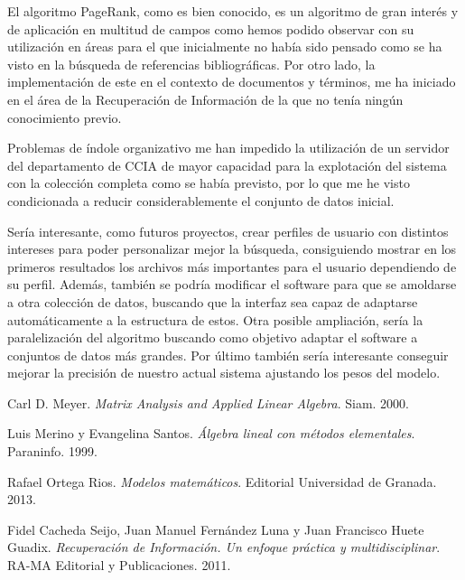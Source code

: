 \documentclass[size=a4, parskip=half, titlepage=false, toc=flat, toc=bib, 12pt, twoside]{scrartcl}
\theoremstyle{theorem-style}
\theoremstyle{definition-style}
\theoremstyle{remark-style}
\theoremstyle{example-style}
\theoremstyle{definition-style}
\theoremstyle{remark-style}
\begin{document}
El algoritmo PageRank, como es bien conocido, es un algoritmo de gran interés y de aplicación en multitud de campos como hemos podido observar con su utilización en áreas para el que inicialmente no había sido pensado como se ha visto en la búsqueda de referencias bibliográficas. Por otro lado, la implementación de este en el contexto de documentos y términos, me ha iniciado en el área de la Recuperación de Información de la que no tenía ningún conocimiento previo.

Problemas de índole organizativo me han impedido la utilización de un servidor del departamento de CCIA de mayor capacidad para la explotación del sistema con la colección completa como se había previsto, por lo que me he visto condicionada a reducir considerablemente el conjunto de datos inicial.

Sería interesante, como futuros proyectos, crear perfiles de usuario con distintos intereses para poder personalizar mejor la búsqueda, consiguiendo mostrar en los primeros resultados los archivos más importantes para el usuario dependiendo de su perfil. Además, también se podría modificar el software para que se amoldarse a otra colección de datos, buscando que la interfaz sea capaz de adaptarse automáticamente a la estructura de estos. Otra posible ampliación, sería la paralelización del algoritmo buscando como objetivo adaptar el software a conjuntos de datos más grandes. Por último también sería interesante conseguir mejorar la precisión de nuestro actual sistema ajustando los pesos del modelo.




\newpage

\begin{thebibliography}{9}
Carl D. Meyer.
\textit{Matrix Analysis and Applied Linear Algebra}. Siam. 2000.

Luis Merino y Evangelina Santos.
\textit{Álgebra lineal con métodos elementales}. Paraninfo. 1999.

Rafael Ortega Rios.
\textit{Modelos matemáticos}. Editorial Universidad de Granada. 2013.

Fidel Cacheda Seijo, Juan Manuel Fernández Luna y Juan Francisco Huete Guadix.
\textit{Recuperación de Información. Un enfoque práctica y multidisciplinar}. RA-MA Editorial y Publicaciones. 2011.

\end{thebibliography}

\newpage
\end{document}
